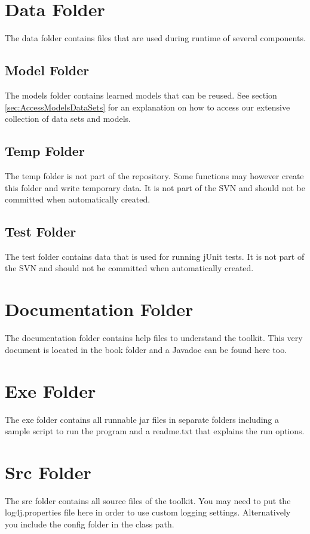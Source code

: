 \section{Data Folder}
The data folder contains files that are used during runtime of several components.

\subsection{Model Folder}
The models folder contains learned models that can be reused. See section \ref{sec:AccessModelsDataSets} for an explanation on how to access our extensive collection of data sets and models.

\subsection{Temp Folder}
The temp folder is not part of the repository. Some functions may however create this folder and write temporary data. It is not part of the SVN and should not be committed when automatically created.

\subsection{Test Folder}  
The test folder contains data that is used for running jUnit tests. It is not part of the SVN and should not be committed when automatically created.

\section{Documentation Folder}
The documentation folder contains help files to understand the toolkit. This very document is located in the book folder and a Javadoc can be found here too.

\section{Exe Folder}
The exe folder contains all runnable jar files in separate folders including a sample script to run the program and a readme.txt that explains the run options.

\section{Src Folder}
The src folder contains all source files of the toolkit. You may need to put the log4j.properties file here in order to use custom logging settings. Alternatively you include the config folder in the class path.
